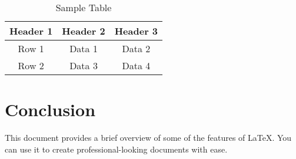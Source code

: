 \documentclass{article} %
\begin{document}
\begin{table}[h]
    \centering
    \begin{tabular}{|c|c|c|}
        \hline
        Header 1 & Header 2 & Header 3 \\ \hline
        Row 1    & Data 1   & Data 2    \\ \hline
        Row 2    & Data 3   & Data 4    \\ \hline
    \end{tabular}
    \caption{Sample Table} %
    \label{tab:sample_table} %
\end{table}

\section{Conclusion} %
This document provides a brief overview of some of the features of LaTeX. You can use it to create professional-looking documents with ease.
\end{document}
